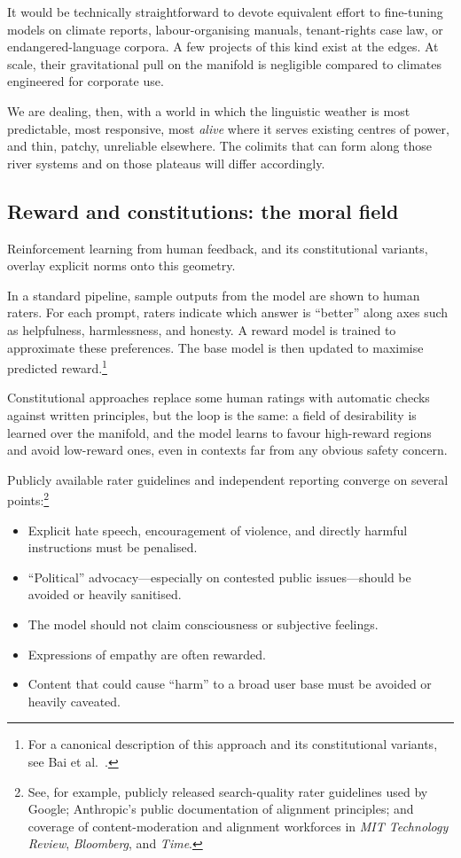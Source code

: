 \documentclass[12pt,a4paper]{article}
\begin{document}
It would be technically straightforward to devote equivalent effort to fine-tuning models on climate reports, labour-organising manuals, tenant-rights case law, or endangered-language corpora. A few projects of this kind exist at the edges. At scale, their gravitational pull on the manifold is negligible compared to climates engineered for corporate use.

We are dealing, then, with a world in which the linguistic weather is most predictable, most responsive, most \emph{alive} where it serves existing centres of power, and thin, patchy, unreliable elsewhere. The colimits that can form along those river systems and on those plateaus will differ accordingly.

\subsection{Reward and constitutions: the moral field}

Reinforcement learning from human feedback, and its constitutional variants, overlay explicit norms onto this geometry.

In a standard pipeline, sample outputs from the model are shown to human raters. For each prompt, raters indicate which answer is ``better'' along axes such as helpfulness, harmlessness, and honesty. A reward model is trained to approximate these preferences. The base model is then updated to maximise predicted reward.\footnote{For a canonical description of this approach and its constitutional variants, see Bai et al.\ \cite{bai2022constitutional}.}

Constitutional approaches replace some human ratings with automatic checks against written principles, but the loop is the same: a field of desirability is learned over the manifold, and the model learns to favour high-reward regions and avoid low-reward ones, even in contexts far from any obvious safety concern.

Publicly available rater guidelines and independent reporting converge on several points:\footnote{See, for example, publicly released search-quality rater guidelines used by Google; Anthropic's public documentation of alignment principles; and coverage of content-moderation and alignment workforces in \emph{MIT Technology Review}, \emph{Bloomberg}, and \emph{Time}.}

\begin{itemize}
  \item Explicit hate speech, encouragement of violence, and directly harmful instructions must be penalised.
  \item ``Political'' advocacy---especially on contested public issues---should be avoided or heavily sanitised.
  \item The model should not claim consciousness or subjective feelings.
  \item Expressions of empathy are often rewarded.
  \item Content that could cause ``harm'' to a broad user base must be avoided or heavily caveated.
\end{itemize}
\end{document}
